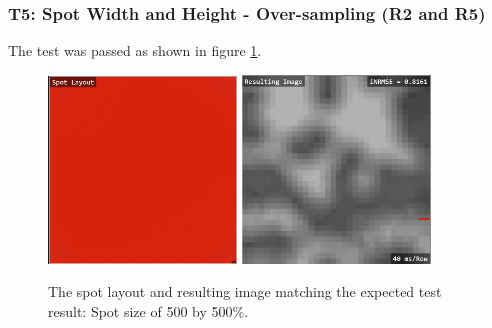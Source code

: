 \documentclass[12pt, titlepage]{article}
\begin{document}
\subsubsection{T5: Spot Width and Height - Over-sampling (R2 and R5)}
The test was passed as shown in figure \ref{fig_t5}.
\begin{figure}[h!]
  \begin{center}
   \includegraphics[width=5cm]{t5a.png}
   \includegraphics[width=5cm]{t5b.png}
  \caption{The spot layout and resulting image matching the expected test result:
  Spot size of 500 by 500\%.}
  \label{fig_t5} 
  \end{center}
\end{figure}
\end{document}
